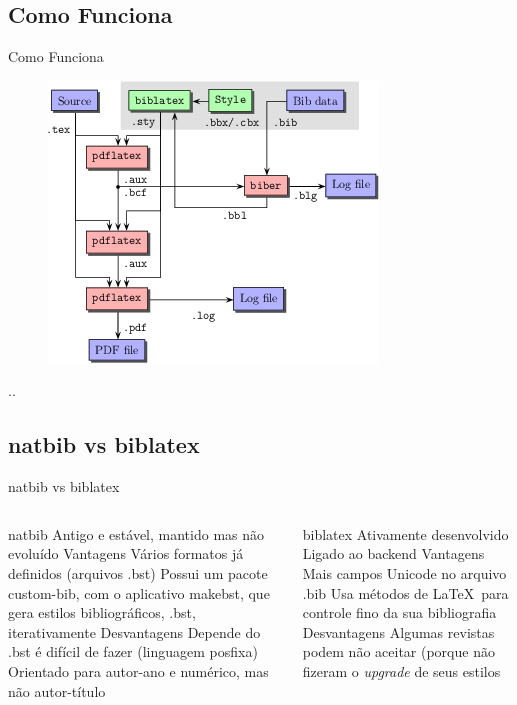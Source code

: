 \documentclass{beamer}
\begin{document}
\subsection{Como Funciona}
\begin{frame}{Como Funciona}
    \begin{figure}
        \centering
        \includegraphics[width=0.7\linewidth]{Images/xMUL7}
        \caption{}
        \label{fig:xmul7}
    \end{figure}
    ..
\end{frame}

\subsection{natbib vs biblatex}
\begin{frame}[shrink=10]{natbib vs biblatex\autocite{biber:2012}}
    \begin{columns}
        \begin{column}{0.5\linewidth}
\begin{outline}
    \1 natbib
    \2 Antigo e estável, mantido mas não evoluído
    \2 Vantagens
    \3 Vários formatos já definidos (arquivos .bst)
    \3 Possui um pacote custom-bib, com o aplicativo makebst, que gera estilos bibliográficos, .bst, iterativamente
    \2 Desvantagens
    \3 Depende do  
    \3 .bst é difícil de fazer (linguagem posfixa)
    \3 Orientado para autor-ano e numérico, mas não autor-título
\end{outline}
        \end{column}
    \begin{column}{0.5\linewidth}
\begin{outline}
    \1 biblatex
    \2 Ativamente desenvolvido
    \2 Ligado ao backend 
    \2 Vantagens
    \3 Mais campos
    \3 Unicode no arquivo .bib
    \3 Usa métodos de \LaTeX\ para controle fino da sua bibliografia
    \2 Desvantagens
    \3 Algumas revistas podem não aceitar (porque não fizeram o \textit{upgrade} de seus estilos
\end{outline}
    \end{column}
    \end{columns}

\end{frame}
\end{document}
